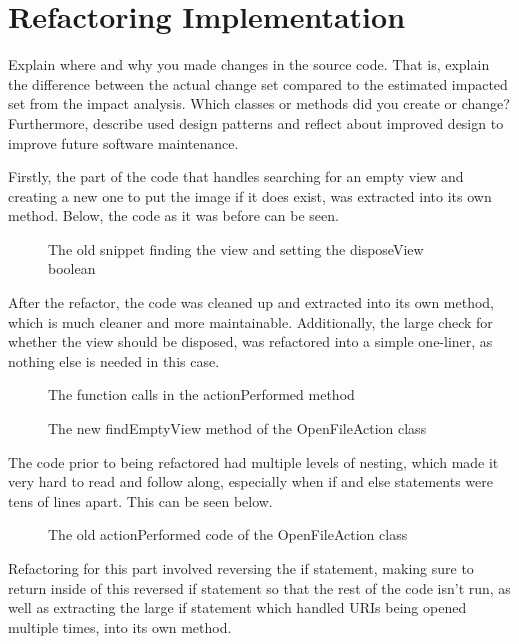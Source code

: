 \section{Refactoring Implementation}
Explain where and why you made changes in the source code.  That is, explain the difference between the actual change set compared to the estimated impacted set from the impact analysis. Which classes or methods did you create or change? Furthermore, describe used design patterns and reflect about improved design to improve future software maintenance.


Firstly, the part of the code that handles searching for an empty view and creating a new one to put the image if it does exist, was extracted into its own method. Below, the code as it was before can be seen.
\begin{figure}[H]
  
  \caption{The old snippet finding the view and setting the disposeView boolean}
\end{figure}

After the refactor, the code was cleaned up and extracted into its own method, which is much cleaner and more maintainable. Additionally, the large check for whether the view should be disposed, was refactored into a simple one-liner, as nothing else is needed in this case.
\begin{figure}[H]
  
  \caption{The function calls in the actionPerformed method}
\end{figure}

\begin{figure}[H]
  
  \caption{The new findEmptyView method of the OpenFileAction class}
\end{figure}

The code prior to being refactored had multiple levels of nesting, which made it very hard to read and follow along, especially when if and else statements were tens of lines apart. This can be seen below.

\begin{figure}[H]
  
  \caption{The old actionPerformed code of the OpenFileAction class}
\end{figure}

Refactoring for this part involved reversing the if statement, making sure to return inside of this reversed if statement so that the rest of the code isn't run, as well as extracting the large if statement which handled URIs being opened multiple times, into its own method.


